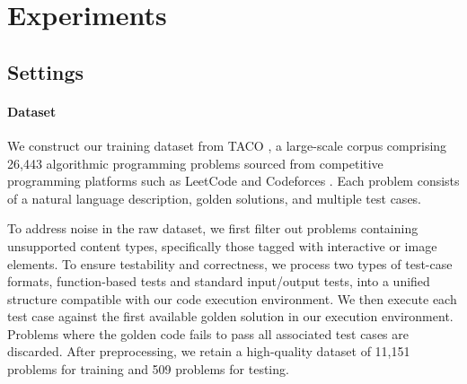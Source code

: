 \documentclass{article} %
\begin{document}
\section{Experiments}
\label{sec:Experiments}
\subsection{Settings}
\paragraph{Dataset} We construct our training dataset from TACO \citep{li2023tacotopicsalgorithmiccode}, a large-scale corpus comprising  26,443 algorithmic programming problems sourced from competitive programming platforms such as LeetCode \citep{leetcode} and Codeforces \citep{codeforces}. Each problem consists of a natural language description, golden solutions, and multiple test cases.

To address noise in the raw dataset, we first filter out problems containing unsupported content types, specifically those tagged with interactive or image elements. To ensure testability and correctness, we process two types of test-case formats, function-based tests and standard input/output tests, into a unified structure compatible with our code execution environment. We then execute each test case against the first available golden solution in our execution environment. Problems where the golden code fails to pass all associated test cases are discarded. After preprocessing, we retain a high-quality dataset of 11,151 problems for training and 509 problems for testing.

\end{document}
